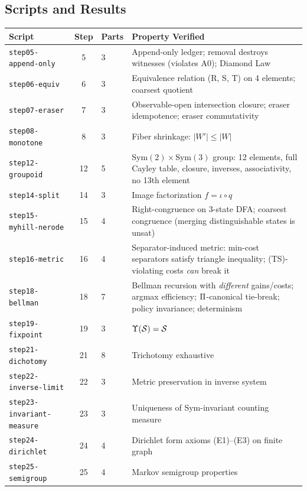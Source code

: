 \subsection{Scripts and Results}

\begin{table}[h!]
\centering
\small
\begin{tabular}{@{}lclp{5.5cm}@{}}
\toprule
\textbf{Script} & \textbf{Step} & \textbf{Parts} & \textbf{Property Verified} \\
\midrule
\texttt{step05-append-only} & 5 & 3 & Append-only ledger; removal destroys witnesses (violates A0); Diamond Law \\
\texttt{step06-equiv} & 6 & 3 & Equivalence relation (R, S, T) on 4 elements; coarsest quotient \\
\texttt{step07-eraser} & 7 & 3 & Observable-open intersection closure; eraser idempotence; eraser commutativity \\
\texttt{step08-monotone} & 8 & 3 & Fiber shrinkage: $|W'| \leq |W|$ \\
\texttt{step12-groupoid} & 12 & 5 & $\mathrm{Sym}(2) \times \mathrm{Sym}(3)$ group: 12 elements, full Cayley table, closure, inverses, associativity, no 13th element \\
\texttt{step14-split} & 14 & 3 & Image factorization $f = \iota \circ q$ \\
\texttt{step15-myhill-nerode} & 15 & 4 & Right-congruence on 3-state DFA; coarsest congruence (merging distinguishable states is unsat) \\
\texttt{step16-metric} & 16 & 4 & Separator-induced metric: min-cost separators satisfy triangle inequality; (TS)-violating costs \emph{can} break it \\
\texttt{step18-bellman} & 18 & 7 & Bellman recursion with \emph{different} gains/costs; argmax efficiency; $\Pi$-canonical tie-break; policy invariance; determinism \\
\texttt{step19-fixpoint} & 19 & 3 & $\Upsilon(\mathcal{S}) = \mathcal{S}$ \\
\texttt{step21-dichotomy} & 21 & 8 & Trichotomy exhaustive \\
\texttt{step22-inverse-limit} & 22 & 3 & Metric preservation in inverse system \\
\texttt{step23-invariant-measure} & 23 & 3 & Uniqueness of Sym-invariant counting measure \\
\texttt{step24-dirichlet} & 24 & 4 & Dirichlet form axioms (E1)--(E3) on finite graph \\
\texttt{step25-semigroup} & 25 & 4 & Markov semigroup properties \\

\end{tabular}
\end{table}

